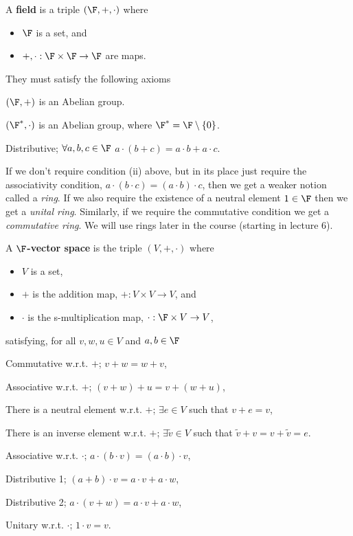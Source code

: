 \bd[Field] 
    A \textbf{field} is a triple $(\F,+,\cdot)$ where
    \begin{itemize}
        \item $\F$ is a set, and
        \item $+,\cdot:\F\times \F \to \F$ are maps.
    \end{itemize}
    They must satisfy the following axioms 
    \benr
        \item $(\F,+)$ is an Abelian group.
        \item $(\F^*,\cdot)$ is an Abelian group, where $\F^*=\F\setminus\{0\}$. 
        \item Distributive; $\forall a,b,c\in \F$ $a\cdot(b+c) = a\cdot b + a\cdot c$.
    \een
\ed 

\br 
    If we don't require condition (ii) above, but in its place just require the associativity condition,  $a\cdot(b\cdot c) = (a\cdot b)\cdot c$, then we get a weaker notion called a \textit{ring}. If we also require the existence of a neutral element $1\in\F$ then we get a \textit{unital ring}. Similarly, if we require the commutative condition we get a \textit{commutative ring}. We will use rings later in the course (starting in lecture 6). 
\er

    A \textbf{$\F$-vector space} is the triple $(V,+,\cdot)$ where 
    \begin{itemize} 
        \item $V$ is a set, 
        \item $+$ is the addition map, $+:V\times V \to V$, and 
        \item $\cdot$ is the s-multiplication map, $\cdot : \F\times V \to V$,
    \end{itemize} 
    satisfying, for all $v,w,u\in V$ and $a,b\in\F$
    \benr 
        \item Commutative w.r.t. $+$; $v+w=w+v$,
        \item Associative w.r.t. $+$; $(v+w)+ u = v +(w+u)$,
        \item There is a neutral element w.r.t. $+$; $\exists e\in V$ such that $v+e=v$,
        \item There is an inverse element w.r.t. $+$; $\exists \widetilde{v}\in V$ such that $\widetilde{v}+v = v + \widetilde{v} = e$.
        \item Associative w.r.t. $\cdot$; $a\cdot(b\cdot v) = (a\cdot b)\cdot v$, 
        \item Distributive 1; $(a+b)\cdot v = a\cdot v + a\cdot w$,
        \item Distributive 2; $a\cdot(v+w) = a\cdot v + a\cdot w$, 
        \item Unitary w.r.t. $\cdot$; $1\cdot v = v$.
    \een 
\ed 

